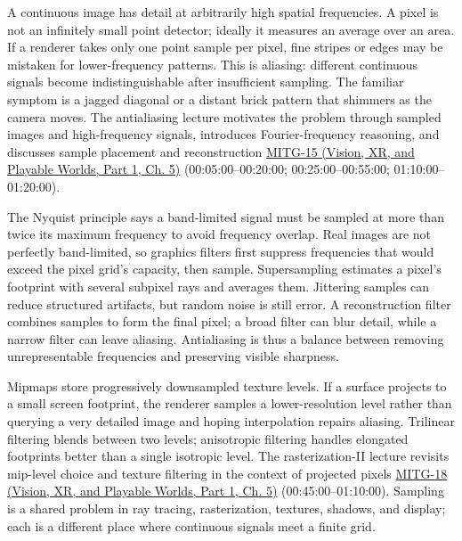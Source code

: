 \hypertarget{03-visual-computing-i-ch003-sampling-and-aliasing-pixels-measure-areas-not-mathematical-points}{}

A continuous image has detail at arbitrarily high spatial frequencies. A pixel is not an infinitely small point detector; ideally it measures an average over an area. If a renderer takes only one point sample per pixel, fine stripes or edges may be mistaken for lower-frequency patterns. This is aliasing: different continuous signals become indistinguishable after insufficient sampling. The familiar symptom is a jagged diagonal or a distant brick pattern that shimmers as the camera moves. The antialiasing lecture motivates the problem through sampled images and high-frequency signals, introduces Fourier-frequency reasoning, and discusses sample placement and reconstruction \href{../07-Vision-XR-and-Playable-Worlds-P01/main.pdf\#nameddest=04-visual-computing-ii-ch036-mitg-15---antialiasing}{MITG-15 (Vision, XR, and Playable Worlds, Part 1, Ch. 5)} (00:05:00--00:20:00; 00:25:00--00:55:00; 01:10:00--01:20:00).

The Nyquist principle says a band-limited signal must be sampled at more than twice its maximum frequency to avoid frequency overlap. Real images are not perfectly band-limited, so graphics filters first suppress frequencies that would exceed the pixel grid's capacity, then sample. Supersampling estimates a pixel's footprint with several subpixel rays and averages them. Jittering samples can reduce structured artifacts, but random noise is still error. A reconstruction filter combines samples to form the final pixel; a broad filter can blur detail, while a narrow filter can leave aliasing. Antialiasing is thus a balance between removing unrepresentable frequencies and preserving visible sharpness.

Mipmaps store progressively downsampled texture levels. If a surface projects to a small screen footprint, the renderer samples a lower-resolution level rather than querying a very detailed image and hoping interpolation repairs aliasing. Trilinear filtering blends between two levels; anisotropic filtering handles elongated footprints better than a single isotropic level. The rasterization-II lecture revisits mip-level choice and texture filtering in the context of projected pixels \href{../07-Vision-XR-and-Playable-Worlds-P01/main.pdf\#nameddest=04-visual-computing-ii-ch036-mitg-18---rasterization-ii}{MITG-18 (Vision, XR, and Playable Worlds, Part 1, Ch. 5)} (00:45:00--01:10:00). Sampling is a shared problem in ray tracing, rasterization, textures, shadows, and display; each is a different place where continuous signals meet a finite grid.

